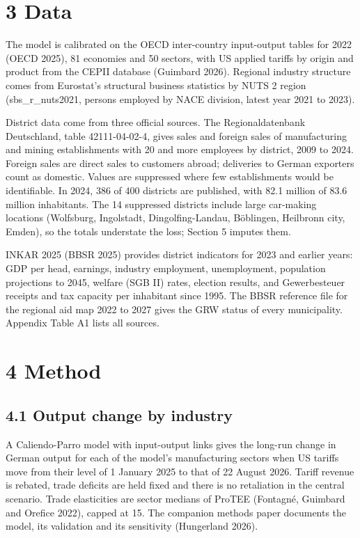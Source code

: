 \documentclass[
  11pt,
]{article}
\begin{document}
\hypertarget{data}{%
\section{3 Data}\label{data}}

The model is calibrated on the OECD inter-country input-output tables
for 2022 (OECD 2025), 81 economies and 50 sectors, with US applied
tariffs by origin and product from the CEPII database (Guimbard 2026).
Regional industry structure comes from Eurostat's structural business
statistics by NUTS 2 region (sbs\_r\_nuts2021, persons employed by NACE
division, latest year 2021 to 2023).

District data come from three official sources. The Regionaldatenbank
Deutschland, table 42111-04-02-4, gives sales and foreign sales of
manufacturing and mining establishments with 20 and more employees by
district, 2009 to 2024. Foreign sales are direct sales to customers
abroad; deliveries to German exporters count as domestic. Values are
suppressed where few establishments would be identifiable. In 2024, 386
of 400 districts are published, with 82.1 million of 83.6 million
inhabitants. The 14 suppressed districts include large car-making
locations (Wolfsburg, Ingolstadt, Dingolfing-Landau, Böblingen,
Heilbronn city, Emden), so the totals understate the loss; Section 5
imputes them.

INKAR 2025 (BBSR 2025) provides district indicators for 2023 and earlier
years: GDP per head, earnings, industry employment, unemployment,
population projections to 2045, welfare (SGB II) rates, election
results, and Gewerbesteuer receipts and tax capacity per inhabitant
since 1995. The BBSR reference file for the regional aid map 2022 to
2027 gives the GRW status of every municipality. Appendix Table A1 lists
all sources.

\hypertarget{method}{%
\section{4 Method}\label{method}}

\hypertarget{output-change-by-industry}{%
\subsection{4.1 Output change by
industry}\label{output-change-by-industry}}

A Caliendo-Parro model with input-output links gives the long-run change
in German output for each of the model's manufacturing sectors when US
tariffs move from their level of 1 January 2025 to that of 22 August
2026. Tariff revenue is rebated, trade deficits are held fixed and there
is no retaliation in the central scenario. Trade elasticities are sector
medians of ProTEE (Fontagné, Guimbard and Orefice 2022), capped at 15.
The companion methods paper documents the model, its validation and its
sensitivity (Hungerland 2026).
\end{document}
